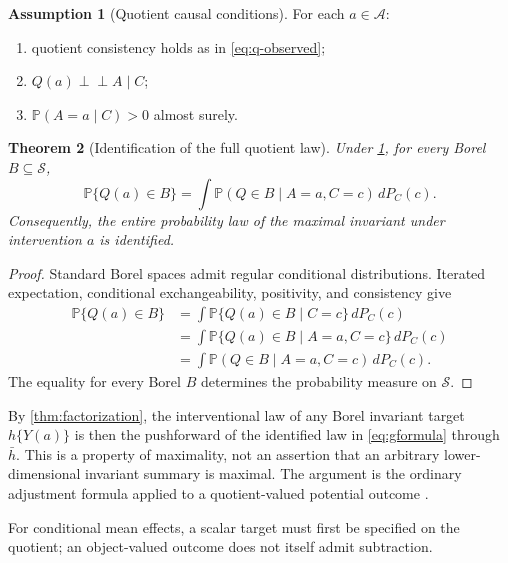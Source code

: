 \documentclass[11pt]{article}
\newtheorem{theorem}{Theorem}[section]
\theoremstyle{definition}
\newtheorem{assumption}[theorem]{Assumption}
\theoremstyle{remark}
\newcommand{\cS}{\mathcal S}
\newcommand{\bP}{\mathbb P}
\newcommand{\indep}{\mathrel{\perp\!\!\!\perp}}
\newcommand{\1}{\mathbf 1}
\begin{document}
\begin{assumption}[Quotient causal conditions]\label{ass:causal}
For each \(a\in\mathcal A\):
\begin{enumerate}[label=(\alph*)]
  \item quotient consistency holds as in \eqref{eq:q-observed};
  \item \(Q(a)\indep A\mid C\);
  \item \(\bP(A=a\mid C)>0\) almost surely.
\end{enumerate}
\end{assumption}

\begin{theorem}[Identification of the full quotient law]\label{thm:gformula}
Under \cref{ass:causal}, for every Borel \(B\subseteq\cS\),
\begin{equation}\label{eq:gformula}
 \bP\{Q(a)\in B\}
 =
 \int \bP(Q\in B\mid A=a,C=c)\,dP_C(c).
\end{equation}
Consequently, the entire probability law of the maximal invariant under
intervention \(a\) is identified.
\end{theorem}

\begin{proof}
Standard Borel spaces admit regular conditional distributions.  Iterated
expectation, conditional exchangeability, positivity, and consistency give
\[
\begin{aligned}
\bP\{Q(a)\in B\}
 &=\int \bP\{Q(a)\in B\mid C=c\}\,dP_C(c)\\
 &=\int \bP\{Q(a)\in B\mid A=a,C=c\}\,dP_C(c)\\
 &=\int \bP(Q\in B\mid A=a,C=c)\,dP_C(c).
\end{aligned}
\]
The equality for every Borel \(B\) determines the probability measure on
\(\cS\).
\end{proof}

By \cref{thm:factorization}, the interventional law of any Borel invariant
target \(h\{Y(a)\}\) is then the pushforward of the identified law in
\eqref{eq:gformula} through \(\bar h\).  This is a property of maximality, not
an assertion that an arbitrary lower-dimensional invariant summary is
maximal.  The argument is the ordinary adjustment formula applied to a
quotient-valued potential outcome \citep{rubin1974estimating,
rosenbaum1983central,robins1986new}.

For conditional mean effects, a scalar target must first be specified on the
quotient; an object-valued outcome does not itself admit subtraction.
\end{document}
